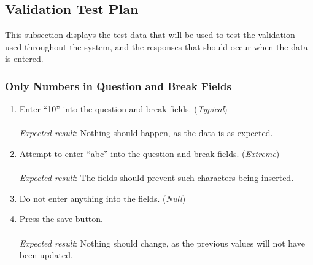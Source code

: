 \subsection{Validation Test Plan} %
\label{sub:validation_testing}
This subsection displays the test data that will be used to test the validation used throughout the system, and the responses that should occur when the data is entered.

\subsubsection{Only Numbers in Question and Break Fields} %
\label{ssub:only_numbers_in_question_and_break_fields}
\begin{enumerate}
  \item Enter ``10'' into the question and break fields. (\textit{Typical})\\\\
  \textit{Expected result}: Nothing should happen, as the data is as expected.\\

  \item Attempt to enter ``abc'' into the question and break fields. (\textit{Extreme})\\\\
  \textit{Expected result}: The fields should prevent such characters being inserted.\\

  \item Do not enter anything into the fields. (\textit{Null})
  \item Press the save button.\\\\
  \textit{Expected result}: Nothing should change, as the previous values will not have been updated.\\
\end{enumerate}
